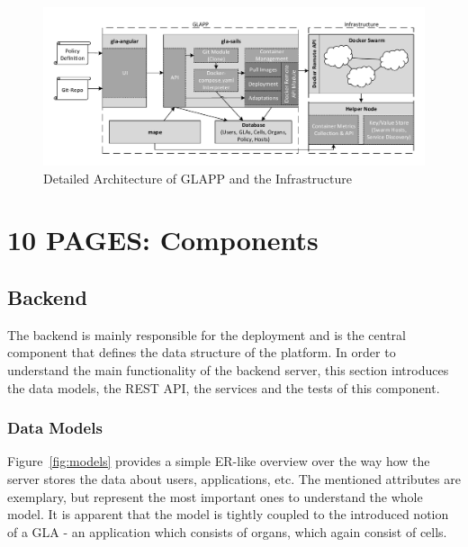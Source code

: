 \documentclass{seal_thesis}
\begin{document}
\begin{figure}[!ht]
\centering
	\includegraphics[width=\textwidth]{detailed_architecture.pdf}
	\caption{Detailed Architecture of GLAPP and the Infrastructure}
	\label{fig:detailed}
\end{figure}


\chapter{10 PAGES: Components}\label{ch:components}

\section{Backend}

The backend is mainly responsible for the deployment and is the central component that defines the data structure of the platform. In order to understand the main functionality of the backend server, this section introduces the data models, the REST API, the services and the tests of this component.

\subsection{Data Models}
Figure~\ref{fig:models} provides a simple ER-like overview over the way how the server stores the data about users, applications, etc.
The mentioned attributes are exemplary, but represent the most important ones to understand the whole model.
It is apparent that the model is tightly coupled to the introduced notion of a GLA - an application which consists of organs, which again consist of cells.
\end{document}
